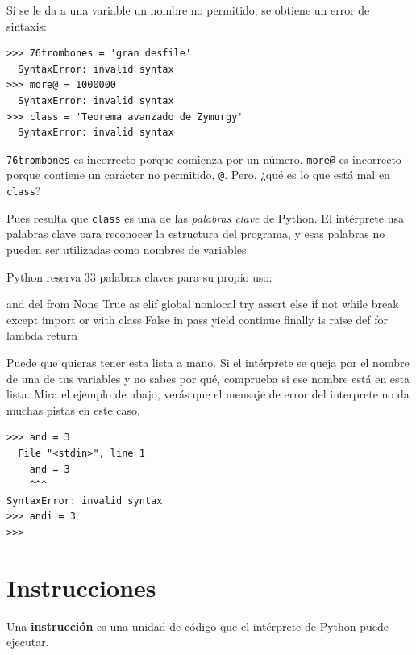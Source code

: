 
Si se le da a una variable un nombre no permitido, se obtiene un error
de sintaxis:

\begin{Verbatim}[frame=single]
>>> 76trombones = 'gran desfile'
  SyntaxError: invalid syntax
>>> more@ = 1000000
  SyntaxError: invalid syntax
>>> class = 'Teorema avanzado de Zymurgy'
  SyntaxError: invalid syntax
\end{Verbatim}

\texttt{76trombones} es incorrecto porque comienza por un número.
\texttt{more@} es incorrecto porque contiene un carácter no permitido,
\texttt{@}. Pero, ¿qué es lo que está mal en \texttt{class}?

Pues resulta que \texttt{class} es una de las \emph{palabras clave} de
Python. El intérprete usa palabras clave para reconocer la estructura
del programa, y esas palabras no pueden ser utilizadas como nombres de
variables.


Python reserva 33 palabras claves para su propio uso:

\begin{python}
and       del       from      None      True
as        elif      global    nonlocal  try
assert    else      if        not       while
break     except    import    or        with
class     False     in        pass      yield
continue  finally   is        raise
def       for       lambda    return
\end{python}

Puede que quieras tener esta lista a mano. Si el intérprete se queja por
el nombre de una de tus variables y no sabes por qué, comprueba si ese
nombre está en esta lista. Mira el ejemplo de abajo, verás que el mensaje de error del interprete no da muchas pistas en este caso.

\begin{Verbatim}[frame=single]
>>> and = 3
  File "<stdin>", line 1
    and = 3
    ^^^
SyntaxError: invalid syntax
>>> andi = 3
>>>
\end{Verbatim}


\hypertarget{instrucciones}{%
\section{Instrucciones}\label{sentencias}}

\begin{definition}
Una \textbf{instrucción} es una unidad de código que el intérprete de Python
puede ejecutar. 
\end{definition}

